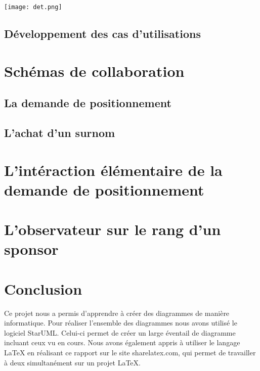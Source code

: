 \documentclass[11pt,a4paper]{article}
\begin{document}
\vspace{4cm}

\texttt{[image: det.png]}

\newpage

\subsection{Développement des cas d’utilisations}


\newpage


\section{Schémas de collaboration}

\subsection{La demande de positionnement}


\newpage

\subsection{L'achat d'un surnom}

\newpage


\section{L'int\'eraction \'el\'ementaire de la demande de positionnement}


\newpage




\section{L'observateur sur le rang d'un sponsor}

\newpage


\section{Conclusion}
Ce projet nous a permis d'apprendre à créer des diagrammes de
manière informatique. Pour réaliser l'ensemble des diagrammes
nous avons utilisé le logiciel StarUML. Celui-ci permet de créer
un large éventail de diagramme incluant ceux vu en cours. Nous
avons également appris à utiliser le langage LaTeX en réalisant
ce rapport sur le site sharelatex.com, qui permet de travailler
à deux simultanément sur un projet LaTeX.
\end{document}
